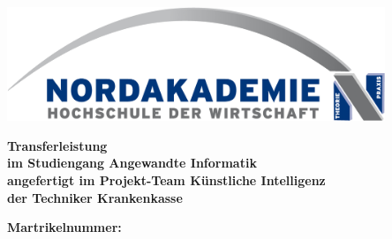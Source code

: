 \thispagestyle{empty}
\begin{center}
\vspace*{-2cm}
\includegraphics[width=0.85\textwidth]{Bilder/Logo_NAK}\\
\vspace*{1.5cm}
    {\titlefont\huge\onehalfspacing{}
	\thetitle{}
    \par}%
\vfill
{
\vspace*{1.5cm}
    \normalfont\normalcolor\bfseries\large
    Transferleistung \\
    \large
    im Studiengang Angewandte Informatik\\
    angefertigt im Projekt-Team Künstliche Intelligenz\\
    der Techniker Krankenkasse\\
    \par
}
\noindent \textbf{Martrikelnummer: \theauthor}\\
\end{center}\par
\noindent\begin{minipage}[b]{\textwidth}
{

  \vspace*{5cm}
  \noindent\textbf{\theLocationAndDate}
}
\end{minipage}
